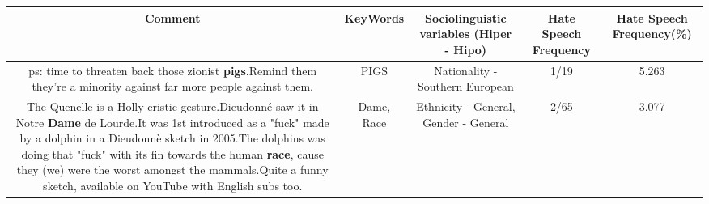 \documentclass[11pt]{article}
\newlength\mylength
\begin{document}
\begin{center}
\setlength\mylength{\dimexpr\textwidth - 1\arrayrulewidth - 50\tabcolsep}
\begin{longtable}{|C{.65\mylength}|C{.30\mylength}|C{.12\mylength}|C{.12\mylength}|C{.12\mylength}|}
\hline
\textbf{Comment} & \textbf{KeyWords} & \textbf{Sociolinguistic variables (Hiper - Hipo)}  & \textbf{Hate Speech Frequency} & \textbf{Hate Speech Frequency(\%)} \\
\hline{}\small ps: time to threaten back those zionist \textbf{pigs}.Remind them they're a minority against far more people against them.\normalsize   & PIGS & Nationality - Southern European & 1/19 & 5.263 \\  \hline
  \small The Quenelle is a Holly cristic gesture.Dieudonné saw it in Notre \textbf{Dame} de Lourde.It was 1st introduced as a "fuck" made by a dolphin in a Dieudonnè sketch in 2005.The dolphins was doing that "fuck" with its fin towards the human \textbf{race}, cause they (we) were the worst amongst the mammals.Quite a funny sketch, available on YouTube with English subs too.\normalsize   & Dame, Race & Ethnicity - General, Gender - General & 2/65 & 3.077 \\  \hline

\end{longtable}
\end{center}
\end{document}
